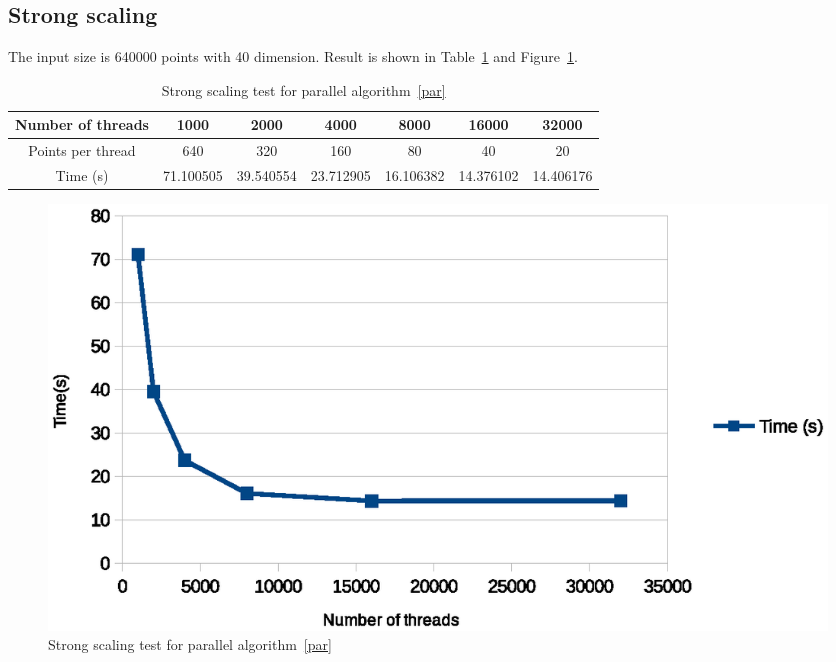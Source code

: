 \subsection{Strong scaling}
The input size is 640000 points with 40 dimension. Result is shown in Table~\ref{tab:strong-scaling} and
Figure~\ref{fig:strong_scaling}. 
\begin{table}[ht]
  \centering
  \begin{tabular}{|c|c|c|c|c|c|c|}
    \hline
    Number of threads	& 1000	    & 2000	    & 4000	& 8000	& 16000 & 32000\\
    \hline
    Points per thread 	&640	&320	&160	&80	&40	&20 \\
    \hline
    Time (s)	 & 71.100505	& 39.540554	& 23.712905	& 16.106382	& 14.376102	& 14.406176	\\
    \hline
  \end{tabular}
  \label{tab:strong-scaling}
  \caption{Strong scaling test for parallel algorithm~\ref{par}}
\end{table}
\begin{figure}[!h]
  \centering
  \includegraphics[width=\linewidth]{fig/strong_scaling}
  \caption{Strong scaling test for parallel algorithm~\ref{par}}
  \label{fig:strong_scaling}
\end{figure}


